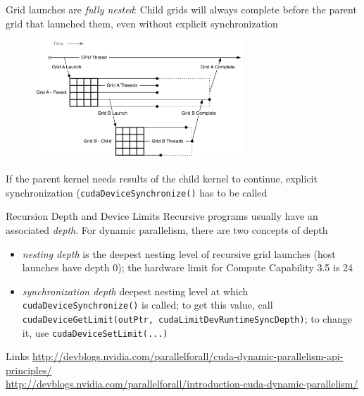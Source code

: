 \documentclass[fleqn,11pt,aspectratio=43]{beamer}
\begin{document}
\begin{frame}
	Grid launches are \textit{fully nested}: Child grids will always complete before the parent grid that launched them, even without explicit synchronization
	\begin{figure}
		\includegraphics[width=0.7\textwidth]{nesting-of-grids.png}
	\end{figure}
	If the parent kernel needs results of the child kernel to continue, explicit synchronization (\texttt{cudaDeviceSynchronize()} has to be called
\end{frame}

\begin{frame}{Recursion Depth and Device Limits}
	Recursive programs usually have an associated \textit{depth}. For dynamic parallelism, there are two concepts of depth
	\begin{itemize}
		\item \textit{nesting depth} is the deepest nesting level of recursive grid launches (host launches have depth 0); the hardware limit for Compute Capability 3.5 is 24
		\item \textit{synchronization depth} deepest nesting level at which \texttt{cudaDeviceSynchronize()} is called; to get this value, call \texttt{cudaDeviceGetLimit(outPtr, cudaLimitDevRuntimeSyncDepth)}; to change it, use \texttt{cudaDeviceSetLimit(...)}
	\end{itemize}
	
\end{frame}

\begin{frame}{Links}
	\url{http://devblogs.nvidia.com/parallelforall/cuda-dynamic-parallelism-api-principles/}\\
	
	\url{http://devblogs.nvidia.com/parallelforall/introduction-cuda-dynamic-parallelism/}
\end{frame}
\end{document}
